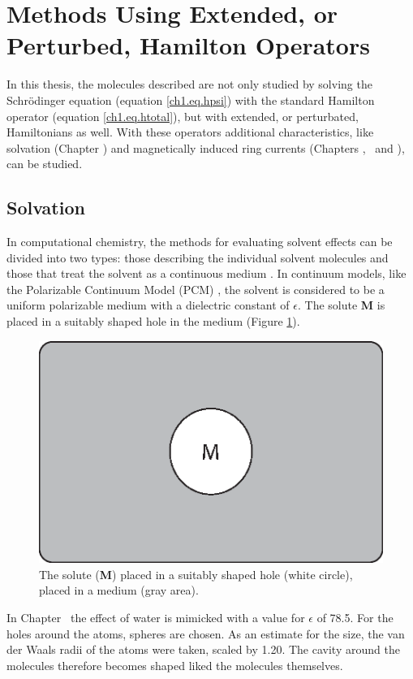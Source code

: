 \section{Methods Using Extended, or Perturbed, Hamilton Operators}
In this thesis, the molecules described are not only studied by solving the Schr\"{o}dinger equation (equation \ref{ch1.eq.hpsi}) with the standard Hamilton operator (equation \ref{ch1.eq.htotal}), but with extended, or perturbated, Hamiltonians as well. With these operators additional characteristics, like solvation  (Chapter \chdissociation) and  magnetically induced ring currents (Chapters \chhuckel, \chinorganic\  and \chindacene), can be studied. 

\subsection{\label{ch1.sec.solv}Solvation}
In computational chemistry, the methods for evaluating solvent effects can be divided into two types: those describing the individual solvent molecules and those that treat the solvent as a continuous medium \cite{jensen}. In continuum models, like the Polarizable Continuum Model (PCM) \cite{pcm1,pcm2}, the solvent is considered to be a uniform polarizable medium with a dielectric constant of $\epsilon$. The solute \textbf{M} is placed in a suitably shaped hole in the medium (Figure \ref{ch1.fig.continuum}).
\begin{figure}[hb]
\center
\includegraphics[scale=0.6]{introduction/figures/continuum.eps}
\caption{The solute (\textbf{M}) placed in a suitably shaped hole (white circle), placed in a medium (gray area).}
\label{ch1.fig.continuum}
\end{figure}
In Chapter \chdissociation\ the effect of water is mimicked with a value for $\epsilon$ of 78.5. For the holes around the atoms, spheres are chosen. As an estimate for the size, the van der Waals radii of the atoms were taken, scaled by 1.20. The cavity around the molecules therefore becomes shaped liked the molecules themselves. 

